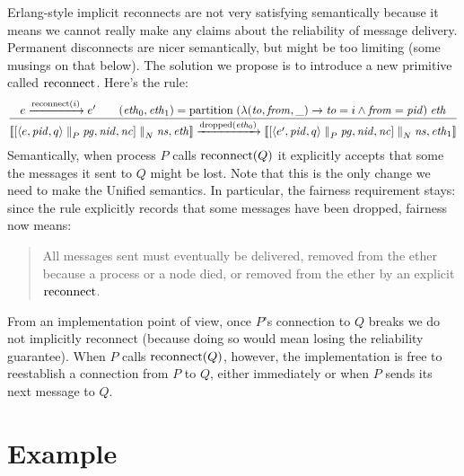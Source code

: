 \documentclass[10pt]{article}
\begin{document}
Erlang-style implicit reconnects are not very satisfying semantically because
it means we cannot really make any claims about the reliability of message
delivery. Permanent disconnects are nicer semantically, but might be too
limiting (some musings on that below). The solution we propose is to introduce
a new primitive called $\mathrm{reconnect}$. Here's the rule:
%
\begin{equation*}
\frac{%
e \xrightarrow{\semRecon(i)} e' \qquad
(\semEth_0, \semEth_1) = \mathrm{partition} \; (\lambda (\mathit{to}, \mathit{from}, \_) \rightarrow \mathit{to} = i \wedge \mathit{from} = \semPid) \; \semEth
}{%
  \semSystem{\semNode{\semProc{e}{\semPid}{q} \semParP \semPg}{\semNid}{\semNc} \semParN \semNs}{\semEth}
\xrightarrow{\semDropped(\semEth_0)}
  \semSystem{\semNode{\semProc{e'}{\semPid}{q} \semParP \semPg}{\semNid}{\semNc} \semParN \semNs}{\semEth_1}
}
\end{equation*}
%
Semantically, when process $P$ calls $\mathrm{reconnect}(Q)$ it explicitly accepts that
some the messages it sent to $Q$ might be lost. Note that this is the only
change we need to make the Unified semantics. In particular, the fairness
requirement stays: since the rule explicitly records that some messages have
been dropped, fairness now means:

\begin{quote}
All messages sent must eventually be delivered, removed from the ether because
a process or a node died, or removed from the ether by an explicit $\mathrm{reconnect}$. 
\end{quote}

From an implementation point of view, once $P$'s connection to $Q$ breaks we do
not implicitly reconnect (because doing so would mean losing the reliability
guarantee). When $P$ calls $\mathrm{reconnect}(Q)$, however, the implementation is 
free to reestablish a connection from $P$ to $Q$, either immediately or when
$P$ sends its next message to $Q$. 

\section*{Example}
\end{document}
